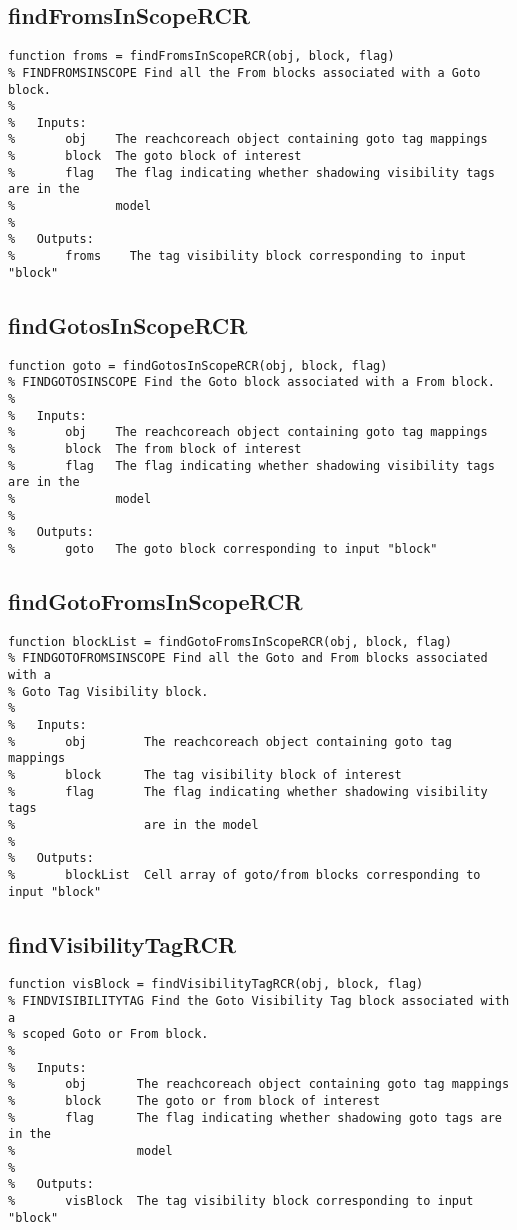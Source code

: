 \documentclass[12pt,letterpaper]{report}
\begin{document}
	\subsection{findFromsInScopeRCR}
\begin{lstlisting}
function froms = findFromsInScopeRCR(obj, block, flag)
% FINDFROMSINSCOPE Find all the From blocks associated with a Goto block.
%
% 	Inputs:
% 		obj    The reachcoreach object containing goto tag mappings
%       block  The goto block of interest
%       flag   The flag indicating whether shadowing visibility tags are in the
%              model
%
% 	Outputs:
%		froms    The tag visibility block corresponding to input "block"
\end{lstlisting}
	\subsection{findGotosInScopeRCR}
\begin{lstlisting}
function goto = findGotosInScopeRCR(obj, block, flag)
% FINDGOTOSINSCOPE Find the Goto block associated with a From block.
%
% 	Inputs:
% 		obj    The reachcoreach object containing goto tag mappings
%       block  The from block of interest
%       flag   The flag indicating whether shadowing visibility tags are in the
%              model
%
% 	Outputs:
%		goto   The goto block corresponding to input "block"
\end{lstlisting}
	\subsection{findGotoFromsInScopeRCR}
\begin{lstlisting}
function blockList = findGotoFromsInScopeRCR(obj, block, flag)
% FINDGOTOFROMSINSCOPE Find all the Goto and From blocks associated with a 
% Goto Tag Visibility block.
%
% 	Inputs:
% 		obj        The reachcoreach object containing goto tag mappings
%       block      The tag visibility block of interest
%       flag       The flag indicating whether shadowing visibility tags 
%                  are in the model
%
% 	Outputs:
%		blockList  Cell array of goto/from blocks corresponding to input "block"
\end{lstlisting}
	\subsection{findVisibilityTagRCR}
\begin{lstlisting}
function visBlock = findVisibilityTagRCR(obj, block, flag)
% FINDVISIBILITYTAG Find the Goto Visibility Tag block associated with a
% scoped Goto or From block.
%
% 	Inputs:
% 		obj       The reachcoreach object containing goto tag mappings
%       block     The goto or from block of interest
%       flag      The flag indicating whether shadowing goto tags are in the
%                 model
%
% 	Outputs:
%		visBlock  The tag visibility block corresponding to input "block"
\end{lstlisting}
\end{document}
